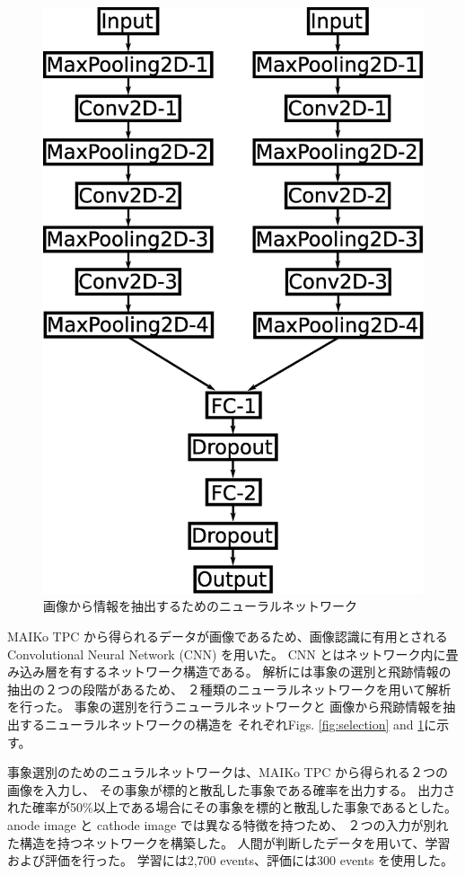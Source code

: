 \documentclass{jps-cp}
\begin{document}
\begin{figure}
\begin{minipage}{0.4\columnwidth}
    \includegraphics[clip, width=0.9\columnwidth]{eps/point_detection.eps}
    \caption{画像から情報を抽出するためのニューラルネットワーク}
    \label{fig:extraction}
  \end{minipage}
\end{figure}

MAIKo TPC から得られるデータが画像であるため、画像認識に有用とされる
Convolutional Neural Network (CNN) を用いた。
CNN とはネットワーク内に畳み込み層を有するネットワーク構造である。
解析には事象の選別と飛跡情報の抽出の２つの段階があるため、
２種類のニューラルネットワークを用いて解析を行った。
事象の選別を行うニューラルネットワークと
画像から飛跡情報を抽出するニューラルネットワークの構造を
それぞれFigs. \ref{fig:selection} and \ref{fig:extraction}に示す。

事象選別のためのニュラルネットワークは、MAIKo TPC から得られる２つの画像を入力し、
その事象が標的と散乱した事象である確率を出力する。
出力された確率が50\%以上である場合にその事象を標的と散乱した事象であるとした。
anode image と cathode image では異なる特徴を持つため、
２つの入力が別れた構造を持つネットワークを構築した。
人間が判断したデータを用いて、学習および評価を行った。
学習には2,700 events、評価には300 events を使用した。
\end{document}
